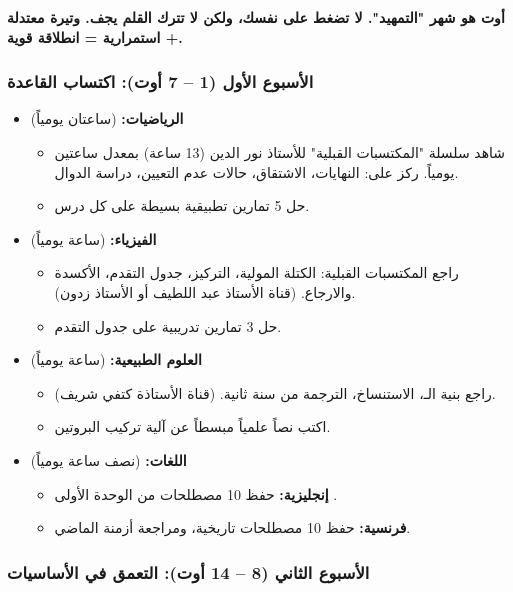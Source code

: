 \documentclass[12pt,a4paper]{book}
\newcommand{\importantAr}[1]{%
	\begin{important}
		\bfseries #1
	\end{important}
}
\begin{document}
	\importantAr{أوت هو شهر "التمهيد". لا تضغط على نفسك، ولكن لا تترك القلم يجف. وتيرة معتدلة + استمرارية = انطلاقة قوية.}
	
	\subsubsection{الأسبوع الأول (1 – 7 أوت): اكتساب القاعدة}
	
	\begin{itemize}
		\item \textbf{الرياضيات:} (ساعتان يومياً)
		\begin{itemize}
			\item شاهد سلسلة "المكتسبات القبلية" للأستاذ نور الدين (13 ساعة) بمعدل ساعتين يومياً. ركز على: النهايات، الاشتقاق، حالات عدم التعيين، دراسة الدوال.
			\item حل 5 تمارين تطبيقية بسيطة على كل درس.
		\end{itemize}
		\item \textbf{الفيزياء:} (ساعة يومياً)
		\begin{itemize}
			\item راجع المكتسبات القبلية: الكتلة المولية، التركيز، جدول التقدم، الأكسدة والارجاع. (قناة الأستاذ عبد اللطيف أو الأستاذ زدون).
			\item حل 3 تمارين تدريبية على جدول التقدم.
		\end{itemize}
		\item \textbf{العلوم الطبيعية:} (ساعة يومياً)
		\begin{itemize}
			\item راجع بنية الـ، الاستنساخ، الترجمة من سنة ثانية. (قناة الأستاذة كتفي شريف).
			\item اكتب نصاً علمياً مبسطاً عن آلية تركيب البروتين.
		\end{itemize}
		\item \textbf{اللغات:} (نصف ساعة يومياً)
		\begin{itemize}
			\item \textbf{إنجليزية:} حفظ 10 مصطلحات من الوحدة الأولى .
			\item \textbf{فرنسية:} حفظ 10 مصطلحات تاريخية، ومراجعة أزمنة الماضي.
		\end{itemize}
	\end{itemize}
	
	\subsubsection{الأسبوع الثاني (8 – 14 أوت): التعمق في الأساسيات}
	
\end{document}

